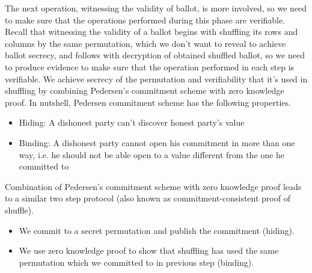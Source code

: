 \documentclass{llncs}
\begin{document}
The next operation, witnessing the validity of ballot, 
is more involved, so we need to make 
sure that the operations performed during this phase are verifiable. 
Recall that witnessing 
the validity of a ballot begins with shuffling its rows and columns 
by the same permutation, which
we don't want to reveal to achieve ballot secrecy, and follows with 
decryption  of obtained shuffled ballot, so 
we need to produce evidence 
to make sure that the operation performed in each step 
is verifiable. We achieve secrecy of the permutation and 
verifiability that it's used in shuffling by combining 
Pedersen's commitment \cite{Pederson} scheme with zero knowledge proof.
In nutshell, Pedersen commitment scheme has the following properties. 
\begin{itemize}
\item Hiding: A dishonest party can't discover honest party's value 
\item Binding: A dishonest party cannot open his commitment in more  
	 	than one way, i.e. he should not be able open to a value 
	 	different from the one he committed to 
\end{itemize}

Combination of Pedersen's commitment scheme 
with zero knowledge proof leads to a similar two step protocol (also known 
as commitment-consistent proof of shuffle)\cite{Wikstrom:2009:CPS}.
\begin{itemize}
\item We commit to a secret permutation and publish the commitment (hiding).
\item We use zero knowledge proof to show that shuffling has used 
      the same permutation which we committed to in previous step (binding).
\end{itemize}  
\end{document}
